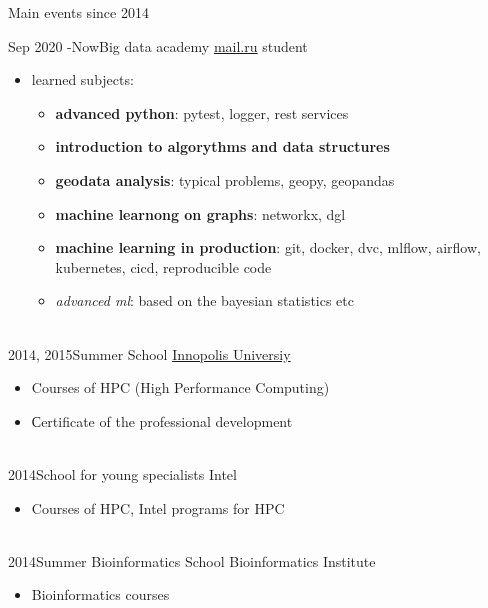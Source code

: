 \documentclass[letterpaper]{twentysecondcv} %
\begin{document}
Main events since 2014

\begin{twenty}
        \twentyitem
        {Sep 2020 -}{Now}{Big data academy}
        {\href{http://data.mail.ru/}{mail.ru} }{student}
        {
            {\begin{itemize}
                \item learned subjects:
                    {\begin{itemize}
                    \item \textbf{advanced python}: pytest, logger, rest services
                    \item \textbf{introduction to algorythms and data structures}
                    \item \textbf{geodata analysis}: typical problems, geopy, geopandas
                    \item \textbf{machine learnong on graphs}: networkx, dgl
                    \item \textbf{machine learning in production}: git, docker, dvc, mlflow, airflow, kubernetes, cicd, reproducible code
                    \item \emph{advanced ml}: based on the bayesian statistics etc
                    \end{itemize}}

            \end{itemize}}
        }
        \\
        \twentyitem
        {2014, 2015}{}{Summer School}
        { \href{https://https://innopolis.university/en/}{Innopolis Universiy}}
        {}
        {
        {\begin{itemize}
            \item Courses of HPC (High Performance Computing)
            \item Сertificate of the professional development
        \end{itemize}}
        }
        \\
        \twentyitem
        {2014}{}{School for young specialists}
        {Intel}{}
        {
        {\begin{itemize}
            \item Courses of HPC, Intel programs for HPC
        \end{itemize}}
        }
        \\
        \twentyitem
        {2014}{}{Summer Bioinformatics School}
        {Bioinformatics Institute}{}
        {
        {\begin{itemize}
            \item Bioinformatics courses
        \end{itemize}}
        }
\end{twenty}
\end{document}
